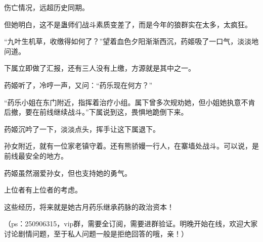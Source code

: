 \begin{this_body}
伤亡情况，远超历史同期。

但她明白，这不是蛊师们战斗素质变差了，而是今年的狼群实在太多，太疯狂。

“九叶生机草，收缴得如何了？”望着血色夕阳渐渐西沉，药姬吸了一口气，淡淡地问道。

下属立即做了汇报，还有三人没有上缴，方源就是其中之一。

药姬听了，冷哼一声，又问：“药乐现在何方？”

“药乐小姐在东门附近，指挥着治疗小组。属下曾多次规劝她，但小姐她执意不肯后撤，要在前线继续战斗。”下属说到这，畏惧地跪倒下来。

药姬沉吟了一下，淡淡点头，挥手让这下属退下。

孙女附近，就有一位家老镇守着。还有熊骄嫚一行人，在寨墙处战斗。可以说，是前线最安全的地方。

药姬虽然溺爱孙女，但也支持她的勇气。

上位者有上位者的考虑。

这些经历，将来就是她古月药乐继承药脉的政治资本！

（ps：250906315，vip群，需要全订阅，需要进群验证。明晚开始在线，欢迎大家讨论剧情问题，至于私人问题一般是拒绝回答的哦，亲！）

\end{this_body}

